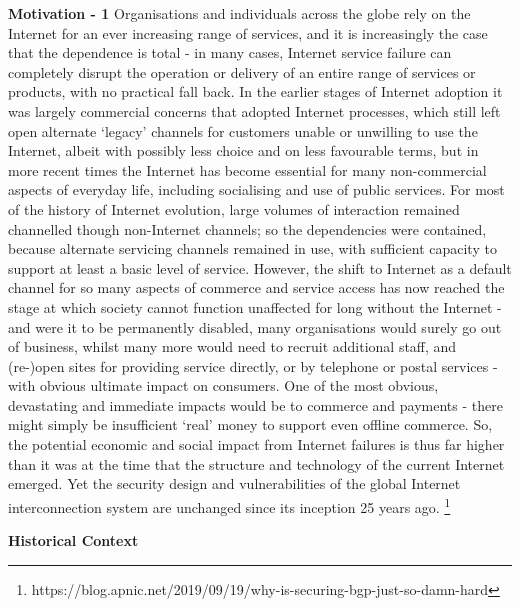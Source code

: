\textbf{Motivation - 1}
Organisations and individuals across the globe rely on the Internet for an ever increasing range of services, and it is increasingly the case that the dependence is total - in many cases, Internet service failure can completely disrupt the operation or delivery of an entire range of services or products, with no practical fall back.
In the earlier stages of Internet adoption it was largely commercial concerns that adopted Internet processes, which still left open alternate `legacy' channels for customers unable or unwilling to use the Internet, albeit with possibly less choice and on less favourable terms, but in more recent times the Internet has become essential for many non-commercial aspects of everyday life, including socialising and use of public services.
For most of the history of Internet evolution, large volumes of interaction remained channelled though non-Internet channels; so the dependencies were contained, because alternate servicing channels remained in use, with sufficient capacity to support at least a basic level of service.
However, the shift to Internet as a default channel for so many aspects of commerce and service access has now reached the stage at which society cannot function unaffected for long without the Internet - and were it to be permanently disabled, many organisations would surely go out of business, whilst many more would need to recruit additional staff, and (re-)open sites for providing service directly, or by telephone or postal services - with obvious ultimate impact on consumers.
One of the most obvious, devastating and immediate impacts would be to commerce and payments - there might simply be insufficient `real' money to support even offline commerce.
So, the potential economic and social impact from Internet failures is thus far higher than it was at the time that the structure and technology of the current Internet emerged.
Yet the security design and vulnerabilities of the global Internet interconnection system are unchanged since its inception 25 years ago.
\footnote{https://blog.apnic.net/2019/09/19/why-is-securing-bgp-just-so-damn-hard}
\medskip

\textbf{Historical Context}

